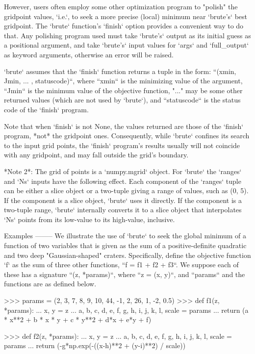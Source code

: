 \begin{DoxyVerb}
However, users often employ some other optimization program to
"polish" the gridpoint values, `i.e.`, to seek a more precise
(local) minimum near `brute's` best gridpoint.
The `brute` function's `finish` option provides a convenient way to do
that.  Any polishing program used must take `brute's` output as its
initial guess as a positional argument, and take `brute's` input values
for `args` and `full_output` as keyword arguments, otherwise an error
will be raised.

`brute` assumes that the `finish` function returns a tuple in the form:
``(xmin, Jmin, ... , statuscode)``, where ``xmin`` is the minimizing value
of the argument, ``Jmin`` is the minimum value of the objective function,
"..." may be some other returned values (which are not used by `brute`),
and ``statuscode`` is the status code of the `finish` program.

Note that when `finish` is not None, the values returned are those
of the `finish` program, *not* the gridpoint ones.  Consequently,
while `brute` confines its search to the input grid points,
the `finish` program's results usually will not coincide with any
gridpoint, and may fall outside the grid's boundary.

*Note 2*: The grid of points is a `numpy.mgrid` object.
For `brute` the `ranges` and `Ns` inputs have the following effect.
Each component of the `ranges` tuple can be either a slice object or a
two-tuple giving a range of values, such as (0, 5).  If the component is a
slice object, `brute` uses it directly.  If the component is a two-tuple
range, `brute` internally converts it to a slice object that interpolates
`Ns` points from its low-value to its high-value, inclusive.

Examples
--------
We illustrate the use of `brute` to seek the global minimum of a function
of two variables that is given as the sum of a positive-definite
quadratic and two deep "Gaussian-shaped" craters.  Specifically, define
the objective function `f` as the sum of three other functions,
``f = f1 + f2 + f3``.  We suppose each of these has a signature
``(z, *params)``, where ``z = (x, y)``,  and ``params`` and the functions
are as defined below.

>>> params = (2, 3, 7, 8, 9, 10, 44, -1, 2, 26, 1, -2, 0.5)
>>> def f1(z, *params):
...     x, y = z
...     a, b, c, d, e, f, g, h, i, j, k, l, scale = params
...     return (a * x**2 + b * x * y + c * y**2 + d*x + e*y + f)

>>> def f2(z, *params):
...     x, y = z
...     a, b, c, d, e, f, g, h, i, j, k, l, scale = params
...     return (-g*np.exp(-((x-h)**2 + (y-i)**2) / scale))


\end{DoxyVerb}
